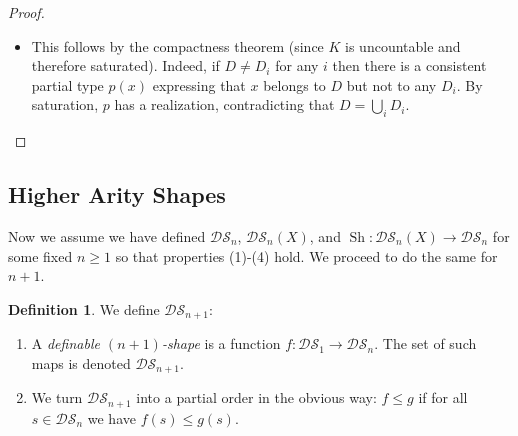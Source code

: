 \documentclass{amsart}
\theoremstyle{definition}
\newtheorem{definition}[theorem]{Definition}
\begin{document}
\begin{proof}
\begin{itemize}
    Now assume $D^P=E^P$. Then since $D\subset E$ we have $D-D^P\subset E-E^P$ and $D^P-D\supset E^P-E$, so that by induction we have $\operatorname{Sh}(D-D^P)\leq\operatorname{Sh}(E-E^P)$ and $\operatorname{Sh}(D^P-D)\geq\operatorname{Sh}(E^P-E)$. Adding everything up now gives $\operatorname{Sh}(D)\leq\operatorname{Sh}(E)$. Moreover, if equality holds then we must have $\operatorname{Sh}(D-D^P)=\operatorname{Sh}(E-E^P)$, so by induction $D-D^P=E-E^P$; and by a similar argument, $D^P-D=E^P-E$. These together with $D^P=E^P$ imply $D=E$.
    \item This follows by the compactness theorem (since $K$ is uncountable and therefore saturated). Indeed, if $D\neq D_i$ for any $i$ then there is a consistent partial type $p(x)$ expressing that $x$ belongs to $D$ but not to any $D_i$. By saturation, $p$ has a realization, contradicting that $D=\bigcup_iD_i$. 
\end{itemize}
\end{proof}

\subsection{Higher Arity Shapes} Now we assume we have defined $\mathcal{DS}_n$, $\mathcal{DS}_n(X)$, and $\operatorname{Sh}:\mathcal{DS}_n(X)\rightarrow\mathcal{DS}_n$ for some fixed $n\geq 1$ so that properties (1)-(4) hold. We proceed to do the same for $n+1$.

\begin{definition} We define $\mathcal{DS}_{n+1}$:
\begin{enumerate}
    \item A \textit{definable $(n+1)$-shape} is a function $f:\mathcal{DS}_1\rightarrow\mathcal{DS}_n$. The set of such maps is denoted $\mathcal{DS}_{n+1}$.
    \item We turn $\mathcal{DS}_{n+1}$ into a partial order in the obvious way: $f\leq g$ if for all $s\in\mathcal{DS}_n$ we have $f(s)\leq g(s)$.
\end{enumerate}
\end{definition}
\end{document}
